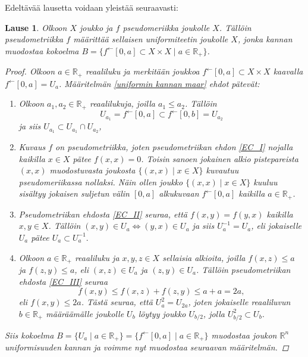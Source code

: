 \documentclass[12pt,a4paper,leqno]{report}
\newcommand{\R}{\mathbb{R}}
\theoremstyle{plain}
\newtheorem{lause}[equation]{Lause}
\theoremstyle{definition}
\theoremstyle{remark}
\begin{document}
\noindent Edeltävää lausetta voidaan yleistää seuraavasti: 
\begin{lause}\label{pseudo_uniformi_maar}
Olkoon $X$ joukko ja $f$ pseudomeriikka joukolle $X$. Tällöin pseudometriikka $f$ määrittää sellaisen uniformiteetin joukolle $X$, jonka kannan muodostaa kokoelma $B=\{ f^{\leftarrow}[0,a]\subset X\times X\mid a\in\R_+\}$.
\begin{proof}
Olkoon $a\in\R_+$ reaaliluku ja merkitään 
joukkoa $f^{\leftarrow}[0,a]\subset X\times X$ kaavalla $f^{\leftarrow}[0,a]=U_a$. 
Määritelmän \ref{uniformin kannan maar} ehdot pätevät:
\begin{enumerate} [label=(B\arabic*)]
\item %
Olkoon $a_1,a_2\in\R_+$ reaalilukuja, joilla $a_1\leq a_2$. 
Tällöin $$U_{a_1}=f^{\leftarrow}[0,a]\subset f^{\leftarrow}[0,b]=U_{a_2}$$ ja siis $U_{a_1}\subset U_{a_1}\cap U_{a_2}$,
\item%
Kuvaus $f$ on pseudometriikka, joten pseudometriikan ehdon \ref{EC_I} nojalla kaikilla $x\in X$ pätee $f(x,x)=0$. Toisin sanoen jokainen alkio pistepareista $(x,x)$ muodostuvasta joukosta $\{(x,x)\mid x\in X\}$ kuvautuu pseudomeriikassa nollaksi. Näin ollen joukko $\{(x,x)\mid x\in X\}$ kuuluu sisältyy jokaisen suljetun välin $[0,a]$ alkukuvaan $f^{\leftarrow}[0,a]$ kaikilla $a\in \R_+$.
\item%
Pseudometriikan ehdosta \ref{EC_II} seuraa, että $f(x,y)=f(y,x)$ kaikilla $x,y\in X$. 
Tällöin $(x,y)\in U_a\Leftrightarrow (y,x)\in U_a$ ja siis $U_a^{-1}=U_a$, eli jokaiselle $U_a$ pätee $U_a\subset U_a^{-1}. $
\item%
Olkoon $a\in\R_+$ reaaliluku ja $x,y,z\in X$ sellaisia alkioita, joilla $f(x,z)\leq a$ ja $f(z,y)\leq a$, eli $(x,z)\in U_a$ ja $(z,y)\in U_a$.
Tällöin pseudometriikan ehdosta \ref{EC_III} seuraa 
$$f(x,y)\leq f(x,z)+f(z,y)\leq a+a=2a,$$ 
eli $f(x,y)\leq 2a$. Tästä seuraa, että $U_a^2=U_{2a} $, joten jokaiselle reaaliluvun $b\in\R_+$ määräämälle joukolle $U_b$ löytyy joukko $U_{b/2}$, jolla $U_{b/2}^2\subset U_b$.
\end{enumerate}
Siis kokoelma $B=\{U_a\mid a\in\R_+\}
=\{f^{\leftarrow}[0,a]\mid a\in\R_+\}
$ muodostaa joukon $\R^n$ uniformisuuden kannan ja voimme nyt muodostaa seuraavan määritelmän.
\end{proof}
\end{lause}
\end{document}
